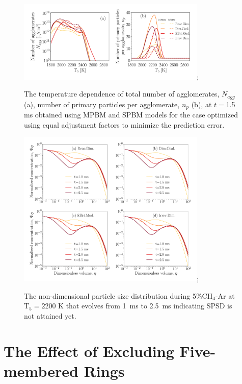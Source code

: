 \begin{figure}[H]
	\centering
	\includegraphics[width=0.8\textwidth]{Figures/Results/Shocktube/Agafonov2016_cpr/N_agg_n_p_pdynamics.pdf};
	\caption{The temperature dependence of total number of agglomerates, $N_{agg}$ (a), number of primary particles per agglomerate, $n_p$ (b), at $t=$1.5 ms obtained using MPBM and SPBM models for the case optimized using equal adjustment factors to minimize the prediction error.}
	\label{fig:shockagof_N_agg_n_p_cpr_pdynamics} 
\end{figure}

\begin{figure}[H]
	\centering
	\includegraphics[width=0.8\textwidth]{Figures/Results/Shocktube/Agafonov2016_cpr/5CH4_psd.pdf};
	\caption{The non-dimensional particle size distribution during 5\%$\mathrm{CH_4}$-Ar at $\mathrm{T_5}=2200$ K that evolves from 1~ms to 2.5~ms indicating SPSD is not attained yet.}
	\label{fig:shockagof_psd} 
\end{figure}

\section{The Effect of Excluding Five-membered Rings}

